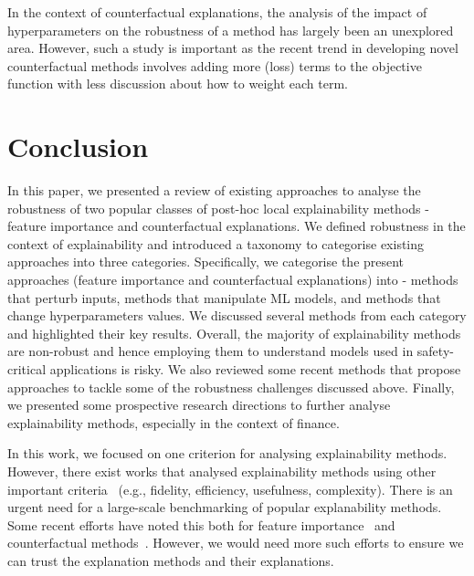 \documentclass[sigconf]{acmart}
\begin{document}
In the context of counterfactual explanations, the analysis of the impact of hyperparameters on the robustness of a method has largely been an unexplored area. However, such a study is important as the recent trend in developing novel counterfactual methods involves adding more (loss) terms to the objective function with less discussion about how to weight each term.

\vspace{-0.25 cm}

\section{Conclusion}

In this paper, we presented a review of existing approaches to analyse the robustness of two popular classes of post-hoc local explainability methods - feature importance and counterfactual explanations. We defined robustness in the context of explainability and introduced a taxonomy to categorise existing approaches into three categories. Specifically, we categorise the present approaches (feature importance and counterfactual explanations) into - methods that perturb inputs, methods that manipulate ML models, and methods that change hyperparameters values. We discussed several methods from each category and highlighted their key results. Overall, the majority of explainability methods are non-robust and hence employing them to understand models used in safety-critical applications is risky. We also reviewed some recent methods that propose approaches to tackle some of the robustness challenges discussed above. Finally, we presented some prospective research directions to further analyse explainability methods, especially in the context of finance.

In this work, we focused on one criterion for analysing explainability methods. However, there exist works that analysed explainability methods using other important criteria~\cite{Bhatt_ijcai_2020, Jacovi_acl_2020} (e.g., fidelity, efficiency, usefulness, complexity). There is an urgent need for a large-scale benchmarking of popular explanability methods. Some recent efforts have noted this both for feature importance~\cite{Warnecke_arXiv_2020, Yang_arXiv_2019} and counterfactual methods~\cite{Pawelczyk_arXiv_2021}. However, we would need more such efforts to ensure we can trust the explanation methods and their explanations.

\end{document}

